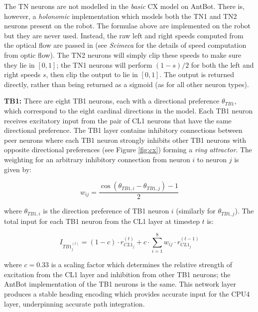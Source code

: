 \documentclass[a4paper,11pt,twoside,openright]{article}
\begin{document}
The TN neurons are not modelled in the \textit{basic} CX model on AntBot. There
is, however, a \textit{holonomic} implementation which models both the TN1 and
TN2 neurons present on the robot. The formulae above are implemented on the
robot but they are never used. Instead, the raw left and right speeds computed
from the optical flow are passed in (see \textit{Scimeca} \cite{Scimeca2017} for
the details of speed computation from optic flow). The TN2 neurons will simply
clip these speeds to make sure they lie in $[0,1]$; the TN1 neurons will perform
$(1 - s) / 2$ for both the left and right speeds $s$, then clip the output to lie
in $[0,1]$. The output is returned directly, rather than being returned as a
sigmoid (as for all other neuron types).
\newline
\par

\textbf{TB1:}
There are eight TB1 neurons, each with a directional preference $\theta_{TB1}$,
which correspond to the eight cardinal directions in the model. Each TB1 neuron
receives excitatory input from the pair of CL1 neurons that have the same
directional preference. The TB1 layer contains inhibitory connections between
peer neurons where each TB1 neuron strongly inhibits other TB1 neurons with
opposite directional preferences (see Figure \ref{fig:cx}) forming a
\textit{ring attractor}\cite{Stone2017}. The weighting for an arbitrary
inhibitory connection from neuron $i$ to neuron $j$ is given by:

\begin{equation}
  w_{ij} =
  \frac{\cos (\theta_{TB1,i} - \theta_{TB1,j}) - 1}{2}
\end{equation}

where $\theta_{TB1,i}$ is the direction preference of TB1 neuron $i$ (similarly
for $\theta_{TB1,j}$). The total input for each TB1 neuron from the CL1 layer
at timestep $t$ is:

\begin{equation}
  I_{TB1_{j}^{(t)}} =
  (1 - c) \cdot r_{CL1_j}^{(t)} + c \cdot \sum_{i = 1}^{8} w_{ij}
  \cdot r_{CL1_j}^{(t - 1)}
\end{equation}

where $c = 0.33$ is a scaling factor which determines the relative strength
of excitation from the CL1 layer and inhibition from other TB1 neurons;
the AntBot implementation of the TB1 neurons is the same. This
network layer produces a stable heading encoding which provides accurate
input for the CPU4 layer, underpinning accurate path integration.
\newline
\par
\end{document}
